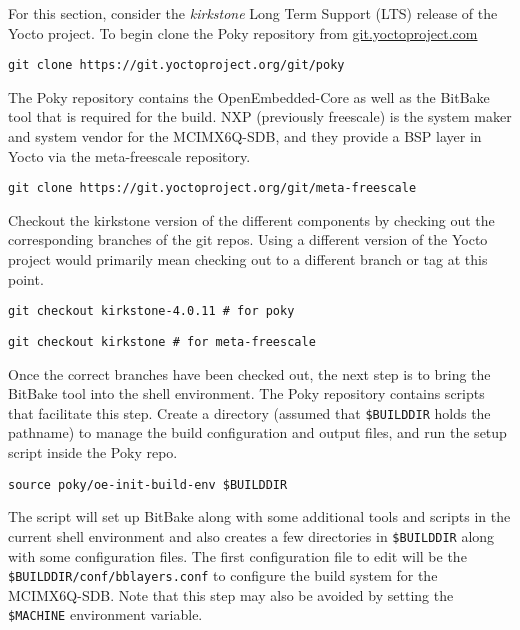 For this section, consider the \textit{kirkstone} Long Term Support (LTS) release of the Yocto project. To begin clone the Poky repository from \href{https://git.yoctoproject.com}{git.yoctoproject.com}

\begin{verbatim}
git clone https://git.yoctoproject.org/git/poky
\end{verbatim}

The Poky repository contains the OpenEmbedded-Core as well as the BitBake tool that is required for the build. NXP (previously freescale) is the system maker and system vendor for the MCIMX6Q-SDB, and they provide a BSP layer in Yocto via the meta-freescale repository.

\begin{verbatim}
git clone https://git.yoctoproject.org/git/meta-freescale
\end{verbatim}

Checkout the kirkstone version of the different components by checking out the corresponding branches of the git repos. Using a different version of the Yocto project would primarily mean checking out to a different branch or tag at this point.

\begin{verbatim}
git checkout kirkstone-4.0.11 # for poky
\end{verbatim}

\begin{verbatim}
git checkout kirkstone # for meta-freescale
\end{verbatim}

Once the correct branches have been checked out, the next step is to bring the BitBake tool into the shell environment. The Poky repository contains scripts that facilitate this step. Create a directory (assumed that \texttt{\$BUILDDIR} holds the pathname) to manage the build configuration and output files, and run the setup script inside the Poky repo.

\begin{verbatim}
source poky/oe-init-build-env $BUILDDIR
\end{verbatim}

The script will set up BitBake along with some additional tools and scripts in the current shell environment and also creates a few directories in \texttt{\$BUILDDIR} along with some configuration files. The first configuration file to edit will be the \texttt{\$BUILDDIR/conf/bblayers.conf} to configure the build system for the MCIMX6Q-SDB. Note that this step may also be avoided by setting the \texttt{\$MACHINE} environment variable.

